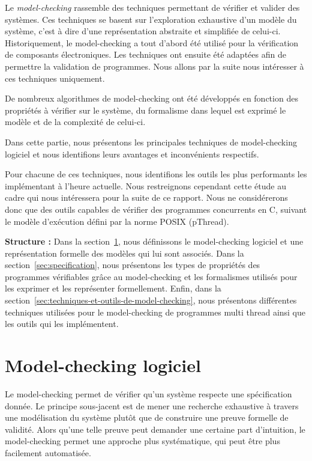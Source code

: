 \label{sec:RevLitt}

Le \emph{model-checking} rassemble des techniques permettant de vérifier
et valider des systèmes. Ces techniques se basent sur l'exploration
exhaustive d'un modèle du système, c'est à dire d'une représentation
abstraite et simplifiée de celui-ci. Historiquement, le model-checking a
tout d'abord été utilisé pour la vérification de composants
électroniques. Les techniques ont ensuite été adaptées afin de permettre
la validation de programmes. Nous allons par la suite nous intéresser à
ces techniques uniquement.

De nombreux algorithmes de model-checking ont été développés en fonction
des propriétés à vérifier sur le système, du formalisme dans lequel est
exprimé le modèle et de la complexité de celui-ci.

Dans cette partie, nous présentons les principales techniques de
model-checking logiciel et nous identifions leurs avantages et
inconvénients respectifs.

Pour chacune de ces techniques, nous identifions les outils les plus performants
les implémentant à l'heure actuelle. Nous restreignons cependant cette étude au
cadre qui nous intéressera pour la suite de ce rapport. Nous ne considérerons
donc que des outils capables de vérifier des programmes concurrents en C,
suivant le modèle d'exécution défini par la norme POSIX (pThread).

\textbf{Structure :} Dans la section~\ref{sec:model-checking-logiciel}, nous
définissons le model-checking logiciel et une représentation formelle des modèles
qui lui sont associés. Dans la section~\ref{sec:specification}, nous présentons
les types de propriétés des programmes vérifiables grâce au model-checking et
les formalismes utilisés pour les exprimer et les représenter formellement.
Enfin, dans la section~\ref{sec:techniques-et-outils-de-model-checking}, nous
présentons différentes techniques utilisées pour le model-checking de programmes
multi thread ainsi que les outils qui les implémentent.

\section{Model-checking logiciel}\label{sec:model-checking-logiciel}

Le model-checking permet de vérifier qu'un système respecte une
spécification donnée. Le principe sous-jacent est de mener une recherche
exhaustive à travers une modélisation du système plutôt que de
construire une preuve formelle de validité. Alors qu'une telle preuve
peut demander une certaine part d'intuition, le model-checking permet
une approche plus systématique, qui peut être plus facilement
automatisée.

